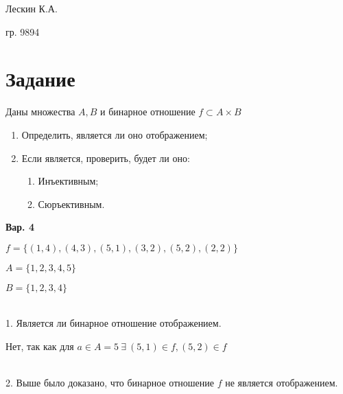 Лескин К.А.

гр. 9894

\section*{Задание}

Даны множества $ A, B $ и бинарное отношение $ f \subset A \times B $

\begin{enumerate}
	\item Определить, является ли оно отображением;
	\item Если является, проверить, будет ли оно:
	\begin{enumerate}
		\item Инъективным;
		\item Сюръективным.
	\end{enumerate}
\end{enumerate}

\textbf{Вар. 4}

$ f = \{(1, 4),(4, 3),(5, 1),(3, 2),(5, 2),(2, 2)\} $

$ A = \{1, 2, 3, 4, 5\} $

$ B = \{1, 2, 3, 4\} $

\ 
\\

1. Является ли бинарное отношение отображением.

Нет, так как для $ a \in A = 5 \ \exists \ (5, 1) \in f, (5,2) \in f $

\
\\

2. Выше было доказано, что бинарное отношение $ f $ не является отображением.